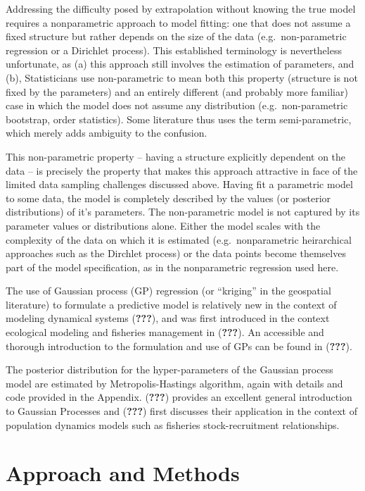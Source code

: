 \documentclass[author-year, review]{elsarticle} %
\begin{document}
Addressing the difficulty posed by extrapolation without knowing the
true model requires a nonparametric approach to model fitting: one that
does not assume a fixed structure but rather depends on the size of the
data (e.g.~non-parametric regression or a Dirichlet process). This
established terminology is nevertheless unfortunate, as (a) this
approach still involves the estimation of parameters, and (b),
Statisticians use non-parametric to mean both this property (structure
is not fixed by the parameters) and an entirely different (and probably
more familiar) case in which the model does not assume any distribution
(e.g.~non-parametric bootstrap, order statistics). Some literature thus
uses the term semi-parametric, which merely adds ambiguity to the
confusion.

This non-parametric property -- having a structure explicitly dependent
on the data -- is precisely the property that makes this approach
attractive in face of the limited data sampling challenges discussed
above. Having fit a parametric model to some data, the model is
completely described by the values (or posterior distributions) of it's
parameters. The non-parametric model is not captured by its parameter
values or distributions alone. Either the model scales with the
complexity of the data on which it is estimated (e.g.~nonparametric
heirarchical approaches such as the Dirchlet process) or the data points
become themselves part of the model specification, as in the
nonparametric regression used here.

The use of Gaussian process (GP) regression (or ``kriging'' in the
geospatial literature) to formulate a predictive model is relatively new
in the context of modeling dynamical systems ({\textbf{???}}), and was
first introduced in the context ecological modeling and fisheries
management in ({\textbf{???}}). An accessible and thorough introduction
to the formulation and use of GPs can be found in ({\textbf{???}}).

The posterior distribution for the hyper-parameters of the Gaussian
process model are estimated by Metropolis-Hastings algorithm, again with
details and code provided in the Appendix. ({\textbf{???}}) provides an
excellent general introduction to Gaussian Processes and
({\textbf{???}}) first discusses their application in the context of
population dynamics models such as fisheries stock-recruitment
relationships.

\section{Approach and Methods}\label{approach-and-methods}
\end{document}

